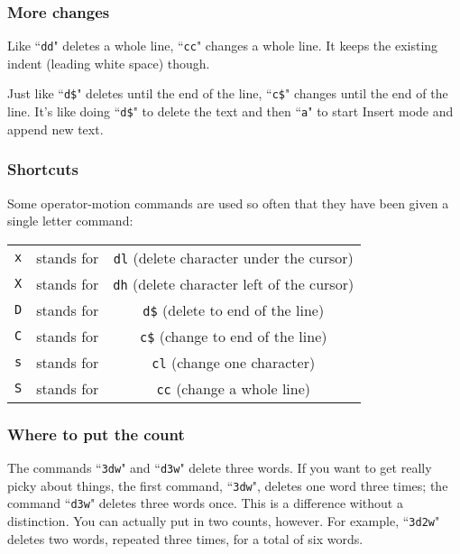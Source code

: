 \subsubsection{More changes}

Like ``\texttt{dd}" deletes a whole line, ``\texttt{cc}" changes a whole line.
It keeps the existing indent (leading white space) though.

Just like ``\texttt{d\$}" deletes until the end of the line, ``\texttt{c\$}" changes until the end of the line.
It's like doing ``\texttt{d\$}" to delete the text and then ``\texttt{a}" to start Insert mode and append new text.

\subsubsection{Shortcuts}

Some operator-motion commands are used so often that they have been given a
single letter command:

\begin{center}
\begin{tabular}{c c c}
				\texttt{x} & stands for & \texttt{dl}  (delete character under the cursor)\\
				\texttt{X} & stands for & \texttt{dh}  (delete character left of the cursor)\\
				\texttt{D} & stands for & \texttt{d\$}  (delete to end of the line)\\
				\texttt{C} & stands for & \texttt{c\$}  (change to end of the line)\\
				\texttt{s} & stands for & \texttt{cl}  (change one character)\\
				\texttt{S} & stands for & \texttt{cc}  (change a whole line)\\
\end{tabular}
\end{center}

\subsubsection{Where to put the count}

The commands ``\texttt{3dw}" and ``\texttt{d3w}" delete three words.
If you want to get really picky about things, the first command, ``\texttt{3dw}", deletes one word three times; the command ``\texttt{d3w}" deletes three words once.
This is a difference without a distinction.
You can actually put in two counts, however.
For example, ``\texttt{3d2w}" deletes two words, repeated three times, for a total of six words.

